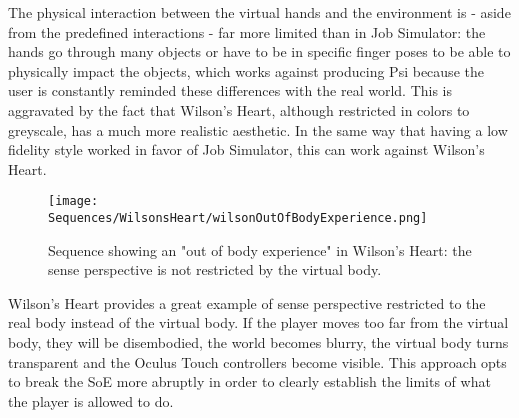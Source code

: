 The physical interaction between the virtual hands and the environment is - aside from the predefined interactions - far more limited than in Job Simulator: the hands go through many objects or have to be in specific finger poses to be able to physically impact the objects, which works against producing Psi because the user is constantly reminded these differences with the real world. This is aggravated by the fact that Wilson's Heart, although restricted in colors to greyscale, has a much more realistic aesthetic. In the same way that having a low fidelity style worked in favor of Job Simulator, this can work against Wilson's Heart.

\begin{figure}[h]
\centering
\texttt{[image: Sequences/WilsonsHeart/wilsonOutOfBodyExperience.png]}
\caption{Sequence showing an "out of body experience" in Wilson's Heart: the sense perspective is not restricted by the virtual body.}
\label{fig:wilsonOutOfBody}
\end{figure}

Wilson's Heart provides a great example of sense perspective restricted to the real body instead of the virtual body. If the player moves too far from the virtual body, they will be disembodied, the world becomes blurry, the virtual body turns transparent and the Oculus Touch controllers become visible. This approach opts to break the SoE more abruptly in order to clearly establish the limits of what the player is allowed to do.